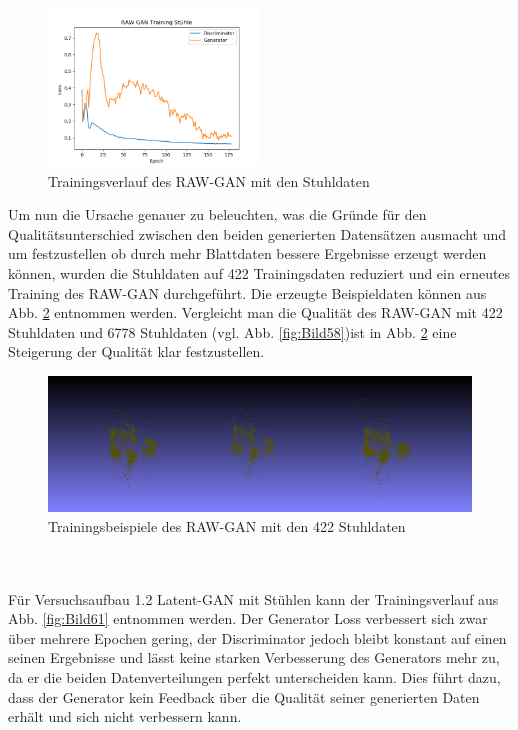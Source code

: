 \documentclass{llncs}
\begin{document}
\begin{figure}[htbp] 
	\centering
	\includegraphics[width=0.5\textwidth]{raw_gan_chair_result.png}
	\caption{Trainingsverlauf des RAW-GAN mit den Stuhldaten}
	\label{fig:Bild57}
\end{figure}
\pagebreak\linebreak 
Um nun die Ursache genauer zu beleuchten, was die Gründe für  den Qualitätsunterschied zwischen den beiden generierten Datensätzen ausmacht und um festzustellen ob durch mehr Blattdaten bessere Ergebnisse erzeugt werden können, wurden die Stuhldaten auf 422 Trainingsdaten reduziert und ein erneutes Training des RAW-GAN durchgeführt. Die erzeugte Beispieldaten können aus Abb. \ref{fig:Bild60} entnommen werden. Vergleicht man die Qualität des RAW-GAN mit 422 Stuhldaten und 
6778 Stuhldaten (vgl. Abb. \ref{fig:Bild58})ist in Abb. \ref{fig:Bild60} eine Steigerung der Qualität klar festzustellen. 
\begin{figure}[htbp] 
	\centering
	\includegraphics[width=1.0\textwidth]{raw_gan_result_400_result.png}
	\caption{Trainingsbeispiele des RAW-GAN mit den 422 Stuhldaten}
	\label{fig:Bild60}
\end{figure}
~\\\\
Für Versuchsaufbau 1.2 Latent-GAN mit Stühlen kann der Trainingsverlauf aus Abb. \ref{fig:Bild61} entnommen werden. Der Generator Loss verbessert sich zwar über mehrere Epochen gering, der Discriminator jedoch bleibt konstant auf einen seinen Ergebnisse und lässt keine starken Verbesserung des Generators mehr zu, da er die beiden Datenverteilungen perfekt unterscheiden kann. Dies führt dazu, dass der Generator kein Feedback über die Qualität seiner generierten Daten erhält und sich nicht verbessern kann.  
\end{document}

